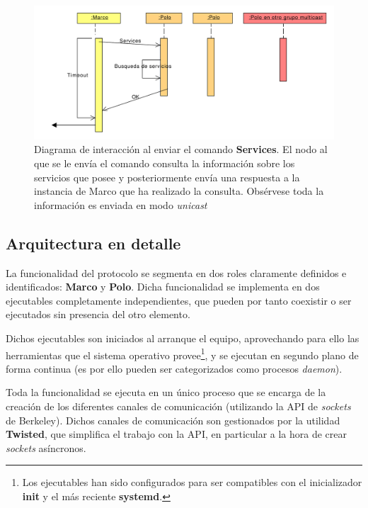 \begin{figure}[H]
	\centering
	\includegraphics[width=\textwidth]{Diagrams/Sequence/services}
	\caption[Diagrama de interacción al enviar el comando \textbf{Services}]{Diagrama de interacción al enviar el comando \textbf{Services}. El nodo al que se le envía el comando consulta la información sobre los servicios que posee y posteriormente envía una respuesta a la instancia de Marco que ha realizado la consulta. Obsérvese toda la información es enviada en modo \textit{unicast}}
	\label{fig:secuencia_services}
\end{figure}

\subsection{Arquitectura en detalle}

La funcionalidad del protocolo se segmenta en dos roles claramente definidos e identificados: \textbf{Marco} y \textbf{Polo}. Dicha funcionalidad se implementa en dos ejecutables completamente independientes, que pueden por tanto coexistir o ser ejecutados sin presencia del otro elemento.

Dichos ejecutables son iniciados al arranque el equipo, aprovechando para ello las herramientas que el sistema operativo provee\footnote{Los ejecutables han sido configurados para ser compatibles con el inicializador \textbf{init} y el más reciente \textbf{systemd}.}, y se ejecutan en segundo plano de forma continua (es por ello pueden ser categorizados como procesos \textit{daemon}).

Toda la funcionalidad se ejecuta en un único proceso que se encarga de la creación de los diferentes canales de comunicación (utilizando la API de \textit{sockets} de Berkeley). Dichos canales de comunicación son gestionados por la utilidad \textbf{Twisted}, que simplifica el trabajo con la API, en particular a la hora de crear \textit{sockets} asíncronos.

